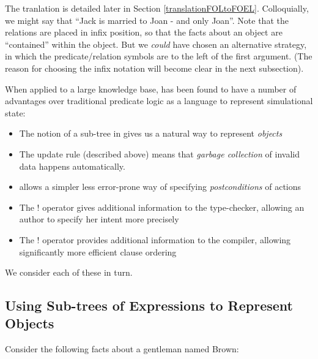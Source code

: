\NI The tranlation is detailed later in Section
\ref{translationFOLtoFOEL}.  Colloquially, we might say that ``Jack is
married to Joan - and only Joan''.  Note that the  relations are
placed in infix position,  so that the facts about an object are
``contained'' within the object.   But we \emph{could}
have chosen an alternative strategy, in which the predicate/relation
symbols are to the left of the first argument. (The reason for
choosing the infix notation will become clear in the next subsection).
 
When applied to a large knowledge base, \ELFULL{} has been found
to have a number of advantages over traditional predicate logic as a
language to represent simulational state:
\begin{itemize}

\item The notion of a sub-tree in \ELABR{} gives us a natural way to
  represent \emph{objects}

\item The update rule (described above) means that \emph{garbage
  collection} of invalid data happens
  automatically.

\item \ELABR{} allows a simpler less error-prone way of specifying
  \emph{postconditions} of actions

\item The $!$ operator gives additional information to the type-checker,
allowing an author to specify her intent more precisely

\item The $!$ operator provides additional information to the
  compiler, allowing significantly more efficient clause ordering

\end{itemize}
We consider  each of these in turn.

\subsection{Using Sub-trees of Expressions to Represent Objects}


\NI Consider the following facts about a gentleman named Brown:

